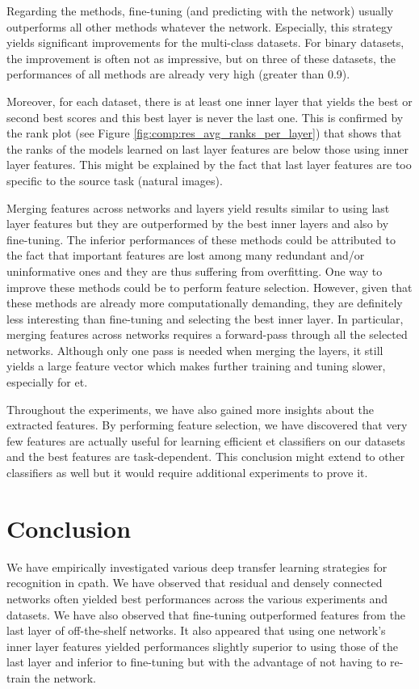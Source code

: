 Regarding the methods, fine-tuning (and predicting with the network) usually outperforms all other methods whatever the network. Especially, this strategy yields significant improvements for the multi-class datasets. For binary datasets, the improvement is often not as impressive, but on three of these datasets, the performances of all methods are already very high (greater than 0.9).

Moreover, for each dataset, there is at least one inner layer that yields the best or second best scores and this best layer is never the last one. This is confirmed by the rank plot (see Figure \ref{fig:comp:res_avg_ranks_per_layer}) that shows that the ranks of the models learned on last layer features are below those using inner layer features. This might be explained by the fact that last layer features are too specific to the source task (\ie natural images).

Merging features across networks and layers yield results similar to using last layer features but they are outperformed by the best inner layers and also by fine-tuning. The inferior performances of these methods could be attributed to the fact that important features are lost among many redundant and/or uninformative ones and they are thus suffering from overfitting. One way to improve these methods could be to perform feature selection. However, given that these methods are already more computationally demanding, they are definitely less interesting than fine-tuning and selecting the best inner layer. In particular, merging features across networks requires a forward-pass through all the selected networks. Although only one pass is needed when merging the layers, it still yields a large feature vector which makes further training and tuning slower, especially for \acrshort{et}.

Throughout the experiments, we have also gained more insights about the extracted features. By performing feature selection, we have discovered that very few features are actually useful for learning efficient \acrshort{et} classifiers on our datasets and the best features are task-dependent. This conclusion might extend to other classifiers as well but it would require additional experiments to prove it.

\section{Conclusion}
\label{sec:comp:conclusion}

We have empirically investigated various deep transfer learning strategies for recognition in \acrlong{cpath}. We have observed that residual and densely connected networks often yielded best performances across the various experiments and datasets. We have also observed that fine-tuning outperformed features from the last layer of off-the-shelf networks. It also appeared that using one network's inner layer features yielded performances slightly superior to using those of the last layer and inferior to fine-tuning but with the advantage of not having to re-train the network. 


